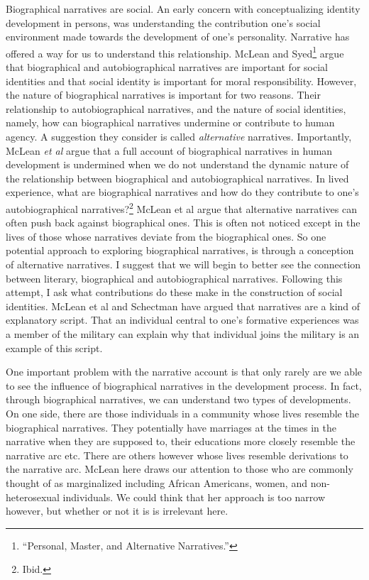 \documentclass[phdthesis,12pt,final,a4paper]{wuthesis}
\theoremstyle{definition}
\theoremstyle{definition}
\theoremstyle{definition}
\theoremstyle{definition}
\theoremstyle{remark}
\begin{document}
Biographical narratives are social. An early concern with conceptualizing identity development in persons, was understanding the contribution one's social environment made towards the development of one's personality. Narrative has offered a way for us to understand this relationship. McLean and Syed\footnote{{``Personal, {Master}, and {Alternative Narratives}.''}} argue that biographical and autobiographical narratives are important for social identities and that social identity is important for moral responsibility. However, the nature of biographical narratives is important for two reasons. Their relationship to autobiographical narratives, and the nature of social identities, namely, how can biographical narratives undermine or contribute to human agency. A suggestion they consider is called \emph{alternative} narratives. Importantly, McLean \emph{et al} argue that a full account of biographical narratives in human development is undermined when we do not understand the dynamic nature of the relationship between biographical and autobiographical narratives. In lived experience, what are biographical narratives and how do they contribute to one's autobiographical narratives?\footnote{Ibid.} McLean et al argue that alternative narratives can often push back against biographical ones. This is often not noticed except in the lives of those whose narratives deviate from the biographical ones. So one potential approach to exploring biographical narratives, is through a conception of alternative narratives. I suggest that we will begin to better see the connection between literary, biographical and autobiographical narratives. Following this attempt, I ask what contributions do these make in the construction of social identities. McLean et al and Schectman have argued that narratives are a kind of explanatory script. That an individual central to one's formative experiences was a member of the military can explain why that individual joins the military is an example of this script.

One important problem with the narrative account is that only rarely are we able to see the influence of biographical narratives in the development process. In fact, through biographical narratives, we can understand two types of developments. On one side, there are those individuals in a community whose lives resemble the biographical narratives. They potentially have marriages at the times in the narrative when they are supposed to, their educations more closely resemble the narrative arc etc. There are others however whose lives resemble derivations to the narrative arc. McLean here draws our attention to those who are commonly thought of as marginalized including African Americans, women, and non-heterosexual individuals. We could think that her approach is too narrow however, but whether or not it is is irrelevant here.
\end{document}
